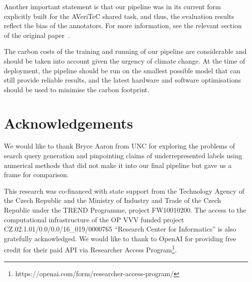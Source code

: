 \documentclass[11pt]{article}
\newcommand{\averitec}{AVeriTeC}
\begin{document}
Another important statement is that our pipeline was in its current form explicitly built for the \averitec{} shared task, and thus, the evaluation results reflect the bias of the annotators. For more information, see the relevant section of the original paper~\cite{averitec2024}.

The carbon costs of the training and running of our pipeline are considerable and should be taken into account given the urgency of climate change. At the time of deployment, the pipeline should be run on the smallest possible model that can still provide reliable results, and the latest hardware and software optimisations should be used to minimise the carbon footprint.

\section*{Acknowledgements}
We would like to thank Bryce Aaron from UNC for exploring the problems of search query generation and pinpointing claims of underrepresented labels using numerical methods that did not make it into our final pipeline but gave us a frame for comparison. 

This research was co-financed with state support from the Technology Agency of the Czech Republic and the Ministry of Industry and Trade of the Czech Republic under the TREND Programme, project FW10010200.
The access to the computational infrastructure of the OP VVV funded project CZ.02.1.01/0.0/0.0/16\_019/0000765 ``Research Center for Informatics'' is also gratefully acknowledged.
We would like to thank to \mbox{OpenAI} for providing free credit for their paid API via Researcher Access Program\footnote{https://openai.com/form/researcher-access-program/}.






\appendix


%

\end{document}
